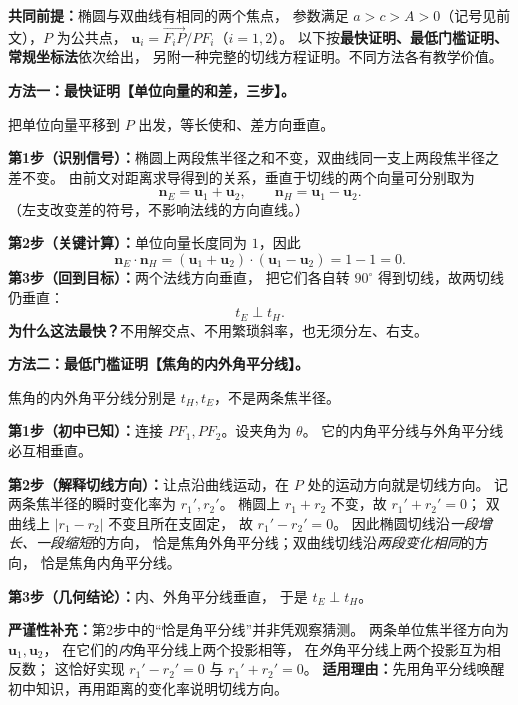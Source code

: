 \clearpage
\begin{proofbox}
\textbf{共同前提：}椭圆与双曲线有相同的两个焦点，
参数满足 $a>c>A>0$（记号见前文），$P$ 为公共点，
$\mathbf u_i=\overrightarrow{F_iP}/PF_i$（$i=1,2$）。
以下按\textbf{最快证明、最低门槛证明、常规坐标法}依次给出，
另附一种完整的切线方程证明。不同方法各有教学价值。

\medskip
\textbf{方法一：最快证明【单位向量的和差，三步】。}

\begin{center}


{\small 把单位向量平移到 $P$ 出发，等长使和、差方向垂直。}
\end{center}


\textbf{第1步（识别信号）：}椭圆上两段焦半径之和不变，双曲线同一支上两段焦半径之差不变。
由前文对距离求导得到的关系，垂直于切线的两个向量可分别取为
\[
\mathbf n_E=\mathbf u_1+\mathbf u_2,\qquad
\mathbf n_H=\mathbf u_1-\mathbf u_2.
\]
（左支改变差的符号，不影响法线的方向直线。）

\textbf{第2步（关键计算）：}单位向量长度同为 $1$，因此
\[
\mathbf n_E\cdot\mathbf n_H
=(\mathbf u_1+\mathbf u_2)\cdot(\mathbf u_1-\mathbf u_2)
=1-1=0.
\]
\textbf{第3步（回到目标）：}两个法线方向垂直，
把它们各自转 $90^\circ$ 得到切线，故两切线仍垂直：
\[
\boxed{t_E\perp t_H}.
\]
\textbf{为什么这法最快？}不用解交点、不用繁琐斜率，也无须分左、右支。
\end{proofbox}

\clearpage
\begin{proofbox}
\textbf{方法二：最低门槛证明【焦角的内外角平分线】。}

\begin{center}


{\small 焦角的内外角平分线分别是 $t_H,t_E$，不是两条焦半径。}
\end{center}


\textbf{第1步（初中已知）：}连接 $PF_1,PF_2$。设夹角为 $\theta$。
它的内角平分线与外角平分线必互相垂直。

\textbf{第2步（解释切线方向）：}让点沿曲线运动，在 $P$ 处的运动方向就是切线方向。
记两条焦半径的瞬时变化率为 $r_1',r_2'$。
椭圆上 $r_1+r_2$ 不变，故 $r_1'+r_2'=0$；
双曲线上 $|r_1-r_2|$ 不变且所在支固定，
故 $r_1'-r_2'=0$。
因此椭圆切线沿\emph{一段增长、一段缩短}的方向，
恰是焦角外角平分线；双曲线切线沿\emph{两段变化相同}的方向，
恰是焦角内角平分线。

\textbf{第3步（几何结论）：}内、外角平分线垂直，
于是 $t_E\perp t_H$。

\textbf{严谨性补充：}第2步中的“恰是角平分线”并非凭观察猜测。
两条单位焦半径方向为 $\mathbf u_1,\mathbf u_2$，
在它们的\emph{内}角平分线上两个投影相等，
在\emph{外}角平分线上两个投影互为相反数；
这恰好实现 $r_1'-r_2'=0$ 与
$r_1'+r_2'=0$。
\textbf{适用理由：}先用角平分线唤醒初中知识，再用距离的变化率说明切线方向。
\end{proofbox}

